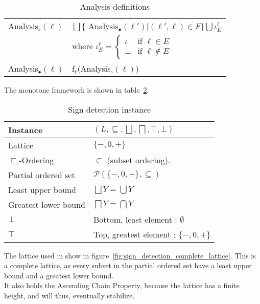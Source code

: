 \begin{table}
\begin{tabular}{| l | l |}
  \hline
  Analysis$_\circ(\ell)$ & $ \bigsqcup \{$ Analysis$_\bullet (\ell') | (\ell', \ell) \in F \} \bigcup \iota_E^{\ell} $ \\
                         & where $\iota_E^{\ell} = \begin{cases} \iota & \text{if } \ell \in E \\ 
                                                                 \bot  & \text{if } \ell \notin E
                                                   \end{cases}$\\
  \hline
  Analysis$_\bullet(\ell)$ & f$_\ell$(Analysis$_\circ(\ell)$)\\
  \hline
\end{tabular}
\centering
\caption{Analysis definitions}
\label{table:signs_analysis_definition}
\end{table}
The monotone framework is shown in table~\ref{table:sign_detection_instance}.
\begin{table}
\begin{tabular}{| l | l |}
  \hline
  Instance & $(L,\sqsubseteq,\bigsqcup, \bigsqcap, \top, \bot )$ \\
  \hline
  \hline
  Lattice  & $\{-,0,+\}$ \\
  \hline
  $\sqsubseteq$-Ordering  &  $\subseteq$ (subset ordering).\\
  \hline
  Partial ordered set    & $\mathcal{P}(\{-,0,+\}, \subseteq)$ \\
  \hline
  Least upper bound      & $\bigsqcup Y = \bigcup Y$\\
  \hline
  Greatest lower bound   & $\bigsqcap Y = \bigcap Y$\\
  \hline
  $\bot$                 & Bottom, least element : $\emptyset$\\
  \hline
  $\top$                 & Top, greatest element : $\{-,0,+\}$\\
\hline   
\end{tabular}
  \centering
  \caption{Sign detection instance}
  \label{table:sign_detection_instance}
\end{table}
\noindent The lattice used in show in figure~\ref{fig:sign_detection_complete_lattice}. This is a complete lattice, as every subset in the partial ordered set have a least upper bound and a greatest lower bound.\\
It also holds the Ascending Chain Property, because the lattice has a finite height, and will thus, eventually stabilize.\\\\
